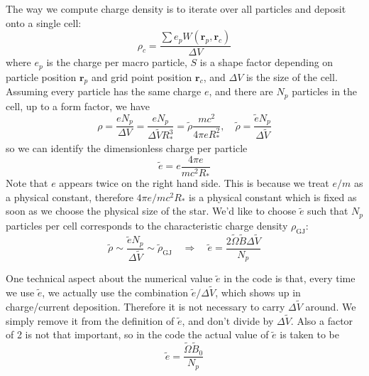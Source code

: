 The way we compute charge density is to iterate over all particles and deposit
onto a single cell:
\begin{equation}
    \rho_c = \frac{\sum e_p W(\mathbf{r}_p, \mathbf{r}_c)}{\Delta V}
\end{equation}
where $e_p$ is the charge per macro particle, $S$ is a shape factor depending on
particle position $\mathbf{r}_p$ and grid point position $\mathbf{r}_c$, and
$\Delta V$ is the size of the cell. Assuming every particle has the same charge
$e$, and there are $N_p$ particles in the cell, up to a form factor, we have
\begin{equation}
    \rho = \frac{e N_p}{\Delta V} = \frac{e N_p}{\Delta \tilde{V} R_{*}^{3}} = \tilde{\rho}\frac{mc^2}{4\pi eR_{*}^2}, \quad \tilde{\rho} = \frac{\tilde{e}N_p}{\Delta \tilde{V}}
\end{equation}
so we can identify the dimensionless charge per particle
\begin{equation}
    \tilde{e} = e \frac{4\pi e}{mc^2R_{*}}
\end{equation}
Note that $e$ appears twice on the right hand side. This is because we treat
$e/m$ as a physical constant, therefore $4\pi e / mc^2R_{*}$ is a physical
constant which is fixed as soon as we choose the physical size of the star. We'd
like to choose $\tilde{e}$ such that $N_p$ particles per cell corresponds to the
characteristic charge density $\rho_\mathrm{GJ}$:
\begin{equation}
    \tilde{\rho} \sim \frac{\tilde{e} N_p}{\Delta \tilde{V}} \sim \tilde{\rho}_\mathrm{GJ} \quad \Longrightarrow \quad \tilde{e} = \frac{2\tilde{\Omega} \tilde{B}\Delta \tilde{V}}{N_p}
\end{equation}

One technical aspect about the numerical value $\tilde{e}$ in the code is that,
every time we use $\tilde{e}$, we actually use the combination $\tilde{e}/\Delta
\tilde{V}$, which shows up in charge/current deposition. Therefore it is not
necessary to carry $\Delta \tilde{V}$ around. We simply remove it from the
definition of $\tilde{e}$, and don't divide by $\Delta \tilde{V}$. Also a factor
of 2 is not that important, so in the code the actual value of $\tilde{e}$ is
taken to be
\begin{equation}
    \tilde{e} = \frac{\tilde{\Omega} \tilde{B}_0}{N_{p}}
\end{equation}

